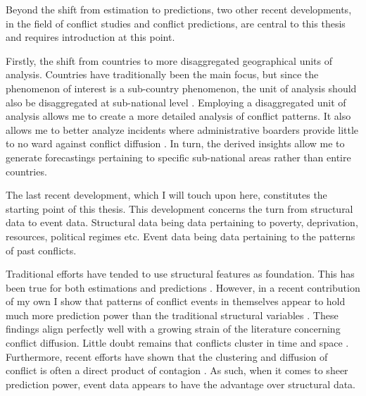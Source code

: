 \documentclass[a4paper]{article}
\begin{document}
Beyond the shift from estimation to predictions, two other recent developments, in the field of conflict studies and conflict predictions, are central to this thesis and requires introduction at this point.\par

Firstly, the shift from countries to more disaggregated geographical units of analysis. Countries have traditionally been the main focus, but since the phenomenon of interest is a sub-country phenomenon, the unit of analysis should also be disaggregated at sub-national level \citep[490]{Cederman_Gleditsch_2009}. Employing a disaggregated unit of analysis allows me to create a more detailed analysis of conflict patterns. It also allows me to better analyze incidents where administrative boarders provide little to no ward against conflict diffusion \citep[445-446]{ol2010afghanistan}. In turn, the derived insights allow me to generate forecastings pertaining to specific sub-national areas rather than entire countries.\par

The last recent development, which I will touch upon here, constitutes the starting point of this thesis. This development concerns the turn from structural data to event data. Structural data being data pertaining to poverty, deprivation, resources, political regimes etc. Event data being data pertaining to the patterns of past conflicts.\par 

Traditional efforts have tended to use structural features as foundation. This has been true for both estimations and predictions \cite[10]{chadefaux2017conflict}. However, in a recent contribution of my own I show that patterns of conflict events in themselves appear to hold much more prediction power than the traditional structural variables \citep{Maase}. These findings align perfectly well with a growing strain of the literature concerning conflict diffusion. Little doubt remains that conflicts cluster in time and space \citep[15]{crost2015conflict}. Furthermore, recent efforts have shown that the clustering and diffusion of conflict is often a direct product of contagion \citep{buhaug2008contagion,schutte2011diffusion,crost2015conflict,bara_2017}. As such, when it comes to sheer prediction power, event data appears to have the advantage over structural data.\par
\end{document}

